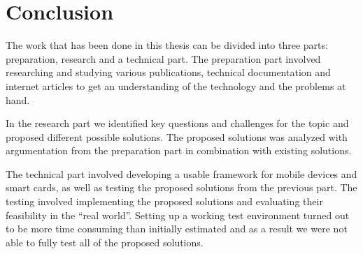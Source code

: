 \chapter{Conclusion}
\label{ch:conclusion}
The work that has been done in this thesis can be divided into three parts: preparation, research and a technical part. The preparation part involved researching and studying various publications, technical documentation and internet articles to get an understanding of the technology and the problems at hand.

In the research part we identified key questions and challenges for the topic and proposed different possible solutions. The proposed solutions was analyzed with argumentation from the preparation part in combination with existing solutions.

The technical part involved developing a usable framework for mobile devices and smart cards, as well as testing the proposed solutions from the previous part. The testing involved implementing the proposed solutions and evaluating their feasibility in the ``real world''. Setting up a working test environment turned out to be more time consuming than initially estimated and as a result we were not able to fully test all of the proposed solutions.

